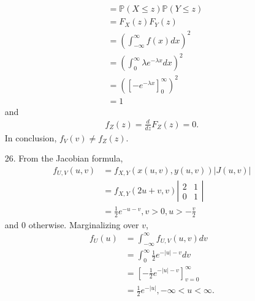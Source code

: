 \documentclass[a4paper,12pt]{article}
\begin{document}
\begin{enumerate}
\begin{align*}
            &= \mathbb{P}(X \leq z) \mathbb{P}(Y \leq z) \\
            &= F_X(z) F_Y(z) \\
            &= \left( \int_{-\infty}^\infty f(x) dx \right)^2 \\
            &= \left( \int_0^\infty \lambda e^{-\lambda x} dx \right)^2 \\
            &= \left( \left[ -e^{-\lambda x} \right]_0^\infty \right)^2 \\
            &= 1
        \end{align*}
        and
        \begin{align*}
            f_Z(z) = \frac{d}{dz} F_Z(z) = 0.
        \end{align*}
        In conclusion, $f_V(v) \neq f_Z(z)$.

    \item[26.] 
        From the Jacobian formula,
        \begin{align*}
            f_{U, V}(u, v) &= f_{X, Y}(x(u, v), y(u, v)) |J(u, v)| \\
            &= f_{X, Y}(2u + v, v)
            \left| \begin{array}{cc}
                2 & 1 \\
                0 & 1
            \end{array} \right| \\
            &= \frac{1}{2} e^{-u - v}, v > 0, u > -\frac{v}{2}
        \end{align*}
        and $0$ otherwise. Marginalizing over $v$,
        \begin{align*}
            f_U(u) &= \int_{-\infty}^\infty f_{U, V}(u, v) dv \\
            &= \int_0^\infty \frac{1}{2} e^{-|u| - v} dv \\
            &= \left[ -\frac{1}{2} e^{-|u| - v} \right]_{v = 0}^\infty \\
            &= \frac{1}{2} e^{-|u|}, -\infty < u < \infty.
        \end{align*}

\end{enumerate}
\end{document}
